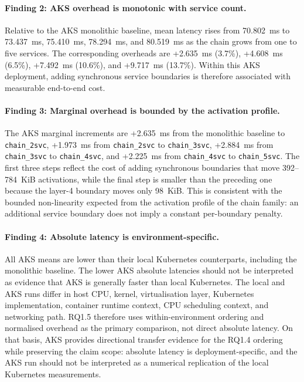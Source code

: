 \paragraph{Finding 2: AKS overhead is monotonic with service count.}
Relative to the AKS monolithic baseline, mean latency rises from 70.802~ms to
73.437~ms, 75.410~ms, 78.294~ms, and 80.519~ms as the chain grows from one to
five services. The corresponding overheads are +2.635~ms (3.7\%), +4.608~ms
(6.5\%), +7.492~ms (10.6\%), and +9.717~ms (13.7\%). Within this AKS
deployment, adding synchronous service boundaries is therefore associated with
measurable end-to-end cost.

\paragraph{Finding 3: Marginal overhead is bounded by the activation profile.}
The AKS marginal increments are +2.635~ms from the monolithic baseline to
\texttt{chain\_2svc}, +1.973~ms from \texttt{chain\_2svc} to
\texttt{chain\_3svc}, +2.884~ms from \texttt{chain\_3svc} to
\texttt{chain\_4svc}, and +2.225~ms from \texttt{chain\_4svc} to
\texttt{chain\_5svc}. The first three steps reflect the cost of adding
synchronous boundaries that move 392--784~KiB activations, while the final
step is smaller than the preceding one because the layer-4 boundary moves
only 98~KiB. This is consistent with the bounded non-linearity expected from
the activation profile of the chain family: an additional service boundary
does not imply a constant per-boundary penalty.

\paragraph{Finding 4: Absolute latency is environment-specific.}
All AKS means are lower than their local Kubernetes counterparts, including
the monolithic baseline. The lower AKS absolute latencies should not be
interpreted as evidence that AKS is generally faster than local Kubernetes.
The local and AKS runs differ in host CPU, kernel, virtualisation layer,
Kubernetes implementation, container runtime context, CPU scheduling context,
and networking path. RQ1.5 therefore uses within-environment ordering and
normalised overhead as the primary comparison, not direct absolute latency. On
that basis, AKS provides directional transfer evidence for the RQ1.4 ordering
while preserving the claim scope: absolute latency is deployment-specific, and
the AKS run should not be interpreted as a numerical replication of the local
Kubernetes measurements.

